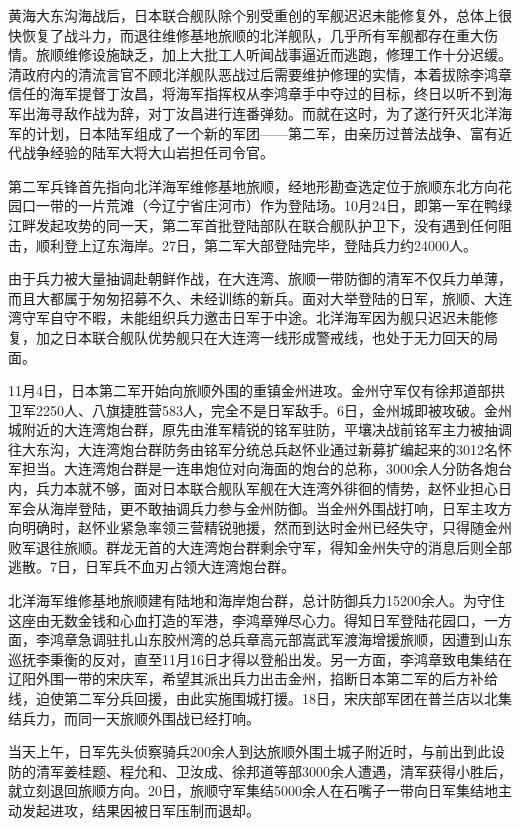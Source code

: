\documentclass[12pt,UTF8]{ctexbook}
\begin{document}
黄海大东沟海战后，日本联合舰队除个别受重创的军舰迟迟未能修复外，总体上很快恢复了战斗力，而退往维修基地旅顺的北洋舰队，几乎所有军舰都存在重大伤情。旅顺维修设施缺乏，加上大批工人听闻战事逼近而逃跑，修理工作十分迟缓。清政府内的清流言官不顾北洋舰队恶战过后需要维护修理的实情，本着拔除李鸿章信任的海军提督丁汝昌，将海军指挥权从李鸿章手中夺过的目标，终日以听不到海军出海寻敌作战为辞，对丁汝昌进行连番弹劾。而就在这时，为了遂行歼灭北洋海军的计划，日本陆军组成了一个新的军团——第二军，由亲历过普法战争、富有近代战争经验的陆军大将大山岩担任司令官。

第二军兵锋首先指向北洋海军维修基地旅顺，经地形勘查选定位于旅顺东北方向花园口一带的一片荒滩（今辽宁省庄河市）作为登陆场。10月24日，即第一军在鸭绿江畔发起攻势的同一天，第二军首批登陆部队在联合舰队护卫下，没有遇到任何阻击，顺利登上辽东海岸。27日，第二军大部登陆完毕，登陆兵力约24000人。

由于兵力被大量抽调赴朝鲜作战，在大连湾、旅顺一带防御的清军不仅兵力单薄，而且大都属于匆匆招募不久、未经训练的新兵。面对大举登陆的日军，旅顺、大连湾守军自守不暇，未能组织兵力邀击日军于中途。北洋海军因为舰只迟迟未能修复，加之日本联合舰队优势舰只在大连湾一线形成警戒线，也处于无力回天的局面。

11月4日，日本第二军开始向旅顺外围的重镇金州进攻。金州守军仅有徐邦道部拱卫军2250人、八旗捷胜营583人，完全不是日军敌手。6日，金州城即被攻破。金州城附近的大连湾炮台群，原先由淮军精锐的铭军驻防，平壤决战前铭军主力被抽调往大东沟，大连湾炮台群防务由铭军分统总兵赵怀业通过新募扩编起来的3012名怀军担当。大连湾炮台群是一连串炮位对向海面的炮台的总称，3000余人分防各炮台内，兵力本就不够，面对日本联合舰队军舰在大连湾外徘徊的情势，赵怀业担心日军会从海岸登陆，更不敢抽调兵力参与金州防御。当金州外围战打响，日军主攻方向明确时，赵怀业紧急率领三营精锐驰援，然而到达时金州已经失守，只得随金州败军退往旅顺。群龙无首的大连湾炮台群剩余守军，得知金州失守的消息后则全部逃散。7日，日军兵不血刃占领大连湾炮台群。

北洋海军维修基地旅顺建有陆地和海岸炮台群，总计防御兵力15200余人。为守住这座由无数金钱和心血打造的军港，李鸿章殚尽心力。得知日军登陆花园口，一方面，李鸿章急调驻扎山东胶州湾的总兵章高元部嵩武军渡海增援旅顺，因遭到山东巡抚李秉衡的反对，直至11月16日才得以登船出发。另一方面，李鸿章致电集结在辽阳外围一带的宋庆军，希望其派出兵力出击金州，掐断日本第二军的后方补给线，迫使第二军分兵回援，由此实施围城打援。18日，宋庆部军团在普兰店以北集结兵力，而同一天旅顺外围战已经打响。

当天上午，日军先头侦察骑兵200余人到达旅顺外围土城子附近时，与前出到此设防的清军姜桂题、程允和、卫汝成、徐邦道等部3000余人遭遇，清军获得小胜后，就立刻退回旅顺方向。20日，旅顺守军集结5000余人在石嘴子一带向日军集结地主动发起进攻，结果因被日军压制而退却。
\end{document}
